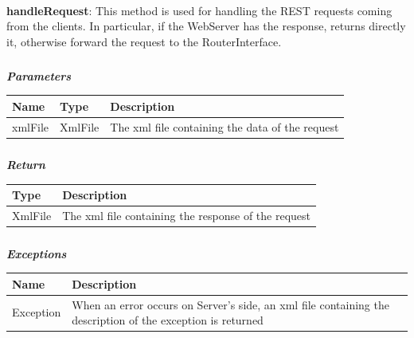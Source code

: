 					\paragraph{}
							\textbf{handleRequest}: This method is used for handling the REST requests coming from the clients. In particular, if the WebServer has the response, returns directly it, otherwise forward the request to the RouterInterface.
							\subparagraph{}
							\vspace{-3mm}
							\textit{\textbf{Parameters}}
							\vspace{-2mm}
								\begin{table}[!h]
									\begin{tabular}{L{0.15\textwidth}L{0.15\textwidth}L{0.5\textwidth}}
										\toprule
										\textbf{Name} & \textbf{Type} & \textbf{Description} \\
										\midrule
								  		xmlFile & XmlFile & The xml file containing the data of the request \\
								 		\bottomrule
									\end{tabular}
								\end{table}
							\subparagraph{}
							\vspace{-6mm}
								\textit{\textbf{Return}}
								\vspace{-2mm}
									\begin{table}[!h]
									\begin{tabular}{L{0.15\textwidth}L{0.65\textwidth}}
										\toprule
										\textbf{Type} & \textbf{Description} \\
										\midrule
								  		XmlFile & The xml file containing the response of the request \\
								 		\bottomrule
									\end{tabular}
								\end{table}
							\subparagraph{}
							\vspace{-6mm}
								\textit{\textbf{Exceptions}}
								\vspace{-2mm}
									\begin{table}[!h]
									\begin{tabular}{L{0.15\textwidth}L{0.65\textwidth}}
										\toprule
										\textbf{Name} & \textbf{Description} \\
										\midrule
								  		Exception & When an error occurs on Server's side, an xml file containing the description of the exception is returned \\ 
								 		\bottomrule
									\end{tabular}
								\end{table}
				\clearpage		
